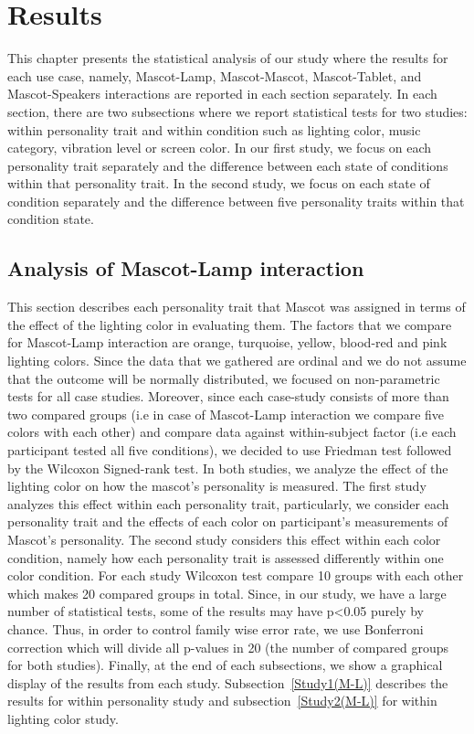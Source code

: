 \chapter{Results}
\label{Results}
This chapter presents the statistical analysis of our study where the results
for each use case, namely, Mascot-Lamp, Mascot-Mascot, Mascot-Tablet, and
Mascot-Speakers interactions are reported in each section separately.
In each section, there are two subsections where we report statistical tests for two
studies: within personality trait and within condition such as lighting color, music
category, vibration level or screen color.
In our first study, we focus on each personality trait separately
and the difference between each state of conditions within that personality trait.
In the second study, we focus on each state of condition separately
and the difference between five personality traits within that condition state.

\section{Analysis of Mascot-Lamp interaction}
\label{M-L}
This section describes each personality trait that Mascot was assigned in terms of
the effect of the lighting color in evaluating them.
The factors that we compare for Mascot-Lamp interaction are orange, turquoise,
yellow, blood-red and pink lighting colors.
Since the data that we gathered are ordinal and we do not assume that the outcome
will be normally distributed, we focused on non-parametric tests for all case studies.
Moreover, since each case-study consists of more than two compared groups
(i.e in case of Mascot-Lamp interaction we compare five colors with each other)
and compare data against within-subject factor (i.e each participant tested all five conditions),
we decided to use Friedman test followed by the Wilcoxon Signed-rank test.
In both studies, we analyze the effect of the lighting color on how the mascot’s personality is measured.
The first study analyzes this effect within each personality trait, particularly, we consider each
personality trait and the effects of each color on participant's measurements of Mascot's personality.
The second study considers this effect within each color condition,
namely how each personality trait is assessed differently within one color condition.
For each study Wilcoxon test compare 10 groups with each other which makes 20 compared groups in total.
Since, in our study, we have a large number of statistical tests, some of the results may have p<0.05 purely by chance.
Thus, in order to control family wise error rate, we use Bonferroni correction which will
divide all p-values in 20 (the number of compared groups for both studies).
Finally, at the end of each subsections, we show a graphical display of the results from each study.
Subsection~\ref{Study1(M-L)} describes the results for within personality study and
subsection~\ref{Study2(M-L)} for within lighting color study.

